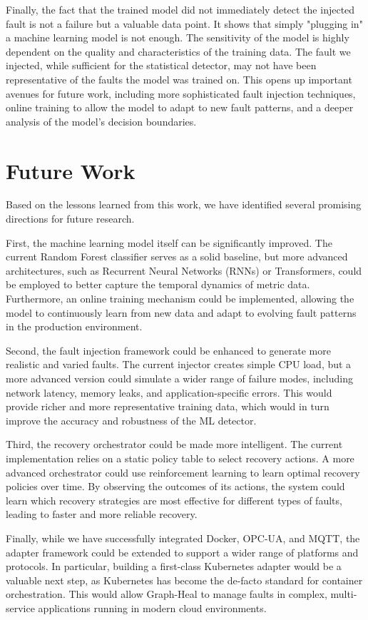 \documentclass[11pt,conference]{IEEEtran}
\begin{document}
Finally, the fact that the trained model did not immediately detect the injected fault is not a failure but a valuable data point. It shows that simply "plugging in" a machine learning model is not enough. The sensitivity of the model is highly dependent on the quality and characteristics of the training data. The fault we injected, while sufficient for the statistical detector, may not have been representative of the faults the model was trained on. This opens up important avenues for future work, including more sophisticated fault injection techniques, online training to allow the model to adapt to new fault patterns, and a deeper analysis of the model's decision boundaries.

\section{Future Work}
\label{sec:future-work}
Based on the lessons learned from this work, we have identified several promising directions for future research.

First, the machine learning model itself can be significantly improved. The current Random Forest classifier serves as a solid baseline, but more advanced architectures, such as Recurrent Neural Networks (RNNs) or Transformers, could be employed to better capture the temporal dynamics of metric data. Furthermore, an online training mechanism could be implemented, allowing the model to continuously learn from new data and adapt to evolving fault patterns in the production environment.

Second, the fault injection framework could be enhanced to generate more realistic and varied faults. The current injector creates simple CPU load, but a more advanced version could simulate a wider range of failure modes, including network latency, memory leaks, and application-specific errors. This would provide richer and more representative training data, which would in turn improve the accuracy and robustness of the ML detector.

Third, the recovery orchestrator could be made more intelligent. The current implementation relies on a static policy table to select recovery actions. A more advanced orchestrator could use reinforcement learning to learn optimal recovery policies over time. By observing the outcomes of its actions, the system could learn which recovery strategies are most effective for different types of faults, leading to faster and more reliable recovery.

Finally, while we have successfully integrated Docker, OPC-UA, and MQTT, the adapter framework could be extended to support a wider range of platforms and protocols. In particular, building a first-class Kubernetes adapter would be a valuable next step, as Kubernetes has become the de-facto standard for container orchestration. This would allow Graph-Heal to manage faults in complex, multi-service applications running in modern cloud environments.
\end{document}

